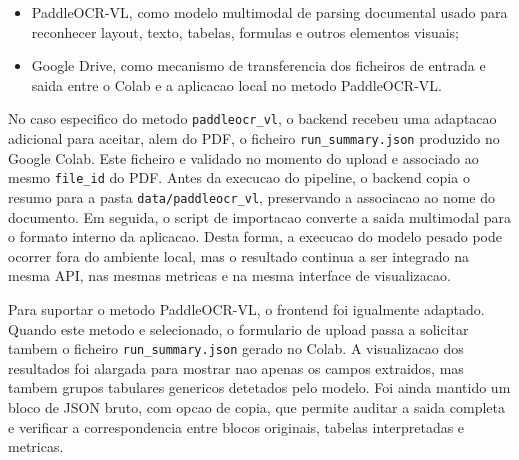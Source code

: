 \begin{itemize}
    \item PaddleOCR-VL, como modelo multimodal de parsing documental usado para
    reconhecer layout, texto, tabelas, formulas e outros elementos visuais;
    \item Google Drive, como mecanismo de transferencia dos ficheiros de entrada
    e saida entre o Colab e a aplicacao local no metodo PaddleOCR-VL.
\end{itemize}


No caso especifico do metodo \texttt{paddleocr\_vl}, o backend recebeu uma
adaptacao adicional para aceitar, alem do PDF, o ficheiro
\texttt{run\_summary.json} produzido no Google Colab. Este ficheiro e validado no
momento do upload e associado ao mesmo \texttt{file\_id} do PDF. Antes da
execucao do pipeline, o backend copia o resumo para a pasta
\texttt{data/paddleocr\_vl}, preservando a associacao ao nome do documento. Em
seguida, o script de importacao converte a saida multimodal para o formato
interno da aplicacao. Desta forma, a execucao do modelo pesado pode ocorrer fora
do ambiente local, mas o resultado continua a ser integrado na mesma API, nas
mesmas metricas e na mesma interface de visualizacao.


Para suportar o metodo PaddleOCR-VL, o frontend foi igualmente adaptado. Quando
este metodo e selecionado, o formulario de upload passa a solicitar tambem o
ficheiro \texttt{run\_summary.json} gerado no Colab. A visualizacao dos
resultados foi alargada para mostrar nao apenas os campos extraidos, mas tambem
grupos tabulares genericos detetados pelo modelo. Foi ainda mantido um bloco de
JSON bruto, com opcao de copia, que permite auditar a saida completa e verificar
a correspondencia entre blocos originais, tabelas interpretadas e metricas.



